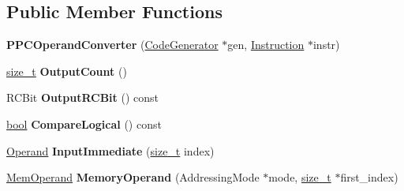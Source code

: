 \subsection*{Public Member Functions}
\begin{DoxyCompactItemize}
\item 
\mbox{\label{classv8_1_1internal_1_1compiler_1_1PPCOperandConverter_a32c83d979a4b7e506eed5266c3ad2dff}} 
{\bfseries P\+P\+C\+Operand\+Converter} (\mbox{\hyperlink{classv8_1_1internal_1_1compiler_1_1CodeGenerator}{Code\+Generator}} $\ast$gen, \mbox{\hyperlink{classv8_1_1internal_1_1compiler_1_1Instruction}{Instruction}} $\ast$instr)
\item 
\mbox{\label{classv8_1_1internal_1_1compiler_1_1PPCOperandConverter_a284abaebfcdb13723f8bc929113a36fc}} 
\mbox{\hyperlink{classsize__t}{size\+\_\+t}} {\bfseries Output\+Count} ()
\item 
\mbox{\label{classv8_1_1internal_1_1compiler_1_1PPCOperandConverter_abd1946babe5e6dc8dbd0243c47a5b7d3}} 
R\+C\+Bit {\bfseries Output\+R\+C\+Bit} () const
\item 
\mbox{\label{classv8_1_1internal_1_1compiler_1_1PPCOperandConverter_aa0496fbd7a26c392a55b54a68b0c874f}} 
\mbox{\hyperlink{classbool}{bool}} {\bfseries Compare\+Logical} () const
\item 
\mbox{\label{classv8_1_1internal_1_1compiler_1_1PPCOperandConverter_a2a90d4958928ace5f32676e85c1c8458}} 
\mbox{\hyperlink{classv8_1_1internal_1_1Operand}{Operand}} {\bfseries Input\+Immediate} (\mbox{\hyperlink{classsize__t}{size\+\_\+t}} index)
\item 
\mbox{\label{classv8_1_1internal_1_1compiler_1_1PPCOperandConverter_afd98962641aca707a642af4fe0cd1daf}} 
\mbox{\hyperlink{classv8_1_1internal_1_1MemOperand}{Mem\+Operand}} {\bfseries Memory\+Operand} (Addressing\+Mode $\ast$mode, \mbox{\hyperlink{classsize__t}{size\+\_\+t}} $\ast$first\+\_\+index)
\item 
\mbox{\label{classv8_1_1internal_1_1compiler_1_1PPCOperandConverter_a9f5d84abb2a0fde03c517c2c0ea30a18}} 

\end{DoxyCompactItemize}
